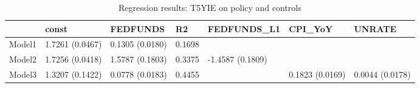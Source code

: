\begin{table}
\caption{Regression results: T5YIE on policy and controls}
\label{tab:results}
\begin{tabular}{lllllll}
\toprule
 & const & FEDFUNDS & R2 & FEDFUNDS_L1 & CPI_YoY & UNRATE \\
\midrule
Model1 & 1.7261 (0.0467) & 0.1305 (0.0180) & 0.1698 &  &  &  \\
Model2 & 1.7256 (0.0418) & 1.5787 (0.1803) & 0.3375 & -1.4587 (0.1809) &  &  \\
Model3 & 1.3207 (0.1422) & 0.0778 (0.0183) & 0.4455 &  & 0.1823 (0.0169) & 0.0044 (0.0178) \\
\bottomrule
\end{tabular}
\end{table}
